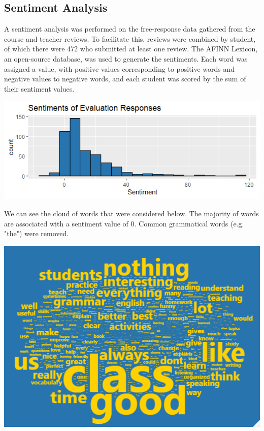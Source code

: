 \documentclass[12pt,letterpaper]{article}
\begin{document}
\subsection{Sentiment Analysis}

A sentiment analysis was performed on the free-response data gathered from the course and teacher reviews. To facilitate this, reviews were combined by student, of which there were 472 who submitted at least one review. The AFINN Lexicon, an open-source database, was used to generate the sentiments. Each word was assigned a value, with positive values corresponding to positive words and negative values to negative words, and each student was scored by the sum of their sentiment values.

\begin{center}
    \includegraphics{Plots/sentiment_hist.png}
\end{center}

\newpage

We can see the cloud of words that were considered below. The majority of words are associated with a sentiment value of 0. Common grammatical words (e.g. "the") were removed.

\begin{center}
    \includegraphics{Plots/full_cloud.png}
\end{center}
\end{document}
